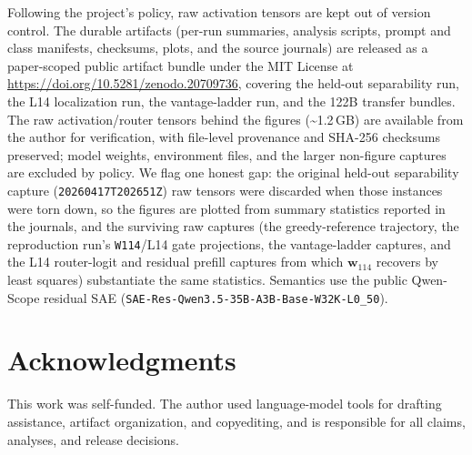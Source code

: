 \documentclass[10pt,a4paper,twocolumn]{article}
\newcommand{\wvec}{\mathbf{w}_{114}}
\begin{document}
Following the project's policy, raw activation tensors are kept out of version
control. The durable artifacts (per-run summaries, analysis scripts, prompt and
class manifests, checksums, plots, and the source journals) are released as a
paper-scoped public artifact bundle under the MIT License at
\url{https://doi.org/10.5281/zenodo.20709736}, covering the held-out
separability run, the L14 localization run, the vantage-ladder run, and the 122B
transfer bundles. The raw activation/router tensors behind the figures
(\textasciitilde1.2\,GB) are available from the author for verification, with
file-level provenance and SHA-256 checksums preserved; model weights, environment
files, and the larger non-figure captures are excluded by policy. We flag one
honest gap: the original held-out separability capture
(\texttt{20260417T202651Z}) raw tensors were discarded when those instances were
torn down, so the figures are plotted from summary statistics reported in the
journals, and the surviving raw captures (the greedy-reference trajectory, the
reproduction run's \texttt{W114}/L14 gate projections, the vantage-ladder
captures, and the L14 router-logit and residual prefill captures from which
$\wvec$ recovers by least squares) substantiate the same statistics. Semantics
use the public Qwen-Scope residual SAE
(\texttt{SAE-Res-Qwen3.5-35B-A3B-Base-W32K-L0\_50}).

\section*{Acknowledgments}

This work was self-funded. The author used language-model tools for drafting
assistance, artifact organization, and copyediting, and is responsible for all
claims, analyses, and release decisions.
\end{document}
